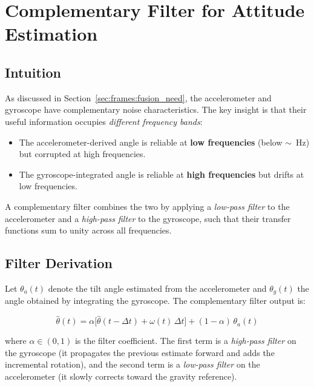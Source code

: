 \section{Complementary Filter for Attitude Estimation}
\label{sec:complementary_filter}


\subsection{Intuition}
\label{sec:cf:intuition}

As discussed in Section~\ref{sec:frames:fusion_need}, the accelerometer and
gyroscope have complementary noise characteristics. The key insight is that
their useful information occupies \emph{different frequency bands}:

\begin{itemize}
  \item The accelerometer-derived angle is reliable at \textbf{low frequencies}
        (below $\sim$~Hz) but corrupted at high frequencies.
  \item The gyroscope-integrated angle is reliable at \textbf{high frequencies}
        but drifts at low frequencies.
\end{itemize}

A complementary filter combines the two by applying a \emph{low-pass filter}
to the accelerometer and a \emph{high-pass filter} to the gyroscope, such
that their transfer functions sum to unity across all frequencies.

\subsection{Filter Derivation}
\label{sec:cf:derivation}

Let $\theta_a(t)$ denote the tilt angle estimated from the accelerometer and
$\theta_g(t)$ the angle obtained by integrating the gyroscope. The
complementary filter output is:

\begin{equation}
  \boxed{
    \hat{\theta}(t) = \alpha \bigl[\hat{\theta}(t - \Delta t)
    + \omega(t)\,\Delta t\bigr]
    + (1 - \alpha)\,\theta_a(t)
  }
  \label{eq:comp_filter}
\end{equation}

\noindent where $\alpha \in (0, 1)$ is the filter coefficient. The first term
is a \emph{high-pass filter} on the gyroscope (it propagates the previous
estimate forward and adds the incremental rotation), and the second term is a
\emph{low-pass filter} on the accelerometer (it slowly corrects toward the
gravity reference).

